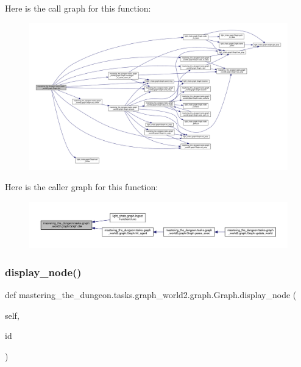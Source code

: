 Here is the call graph for this function\+:
\nopagebreak
\begin{figure}[H]
\begin{center}
\leavevmode
\includegraphics[width=350pt]{classmastering__the__dungeon_1_1tasks_1_1graph__world2_1_1graph_1_1Graph_a3c6ce42eda8759a82bba26bd2f4d1822_cgraph}
\end{center}
\end{figure}
Here is the caller graph for this function\+:
\nopagebreak
\begin{figure}[H]
\begin{center}
\leavevmode
\includegraphics[width=350pt]{classmastering__the__dungeon_1_1tasks_1_1graph__world2_1_1graph_1_1Graph_a3c6ce42eda8759a82bba26bd2f4d1822_icgraph}
\end{center}
\end{figure}
\mbox{\label{classmastering__the__dungeon_1_1tasks_1_1graph__world2_1_1graph_1_1Graph_a2c19742101a04eeb5850543393e553e6}} 
\subsubsection{\texorpdfstring{display\+\_\+node()}{display\_node()}}
{\footnotesize\ttfamily def mastering\+\_\+the\+\_\+dungeon.\+tasks.\+graph\+\_\+world2.\+graph.\+Graph.\+display\+\_\+node (\begin{DoxyParamCaption}\item[{}]{self,  }\item[{}]{id }\end{DoxyParamCaption})}



